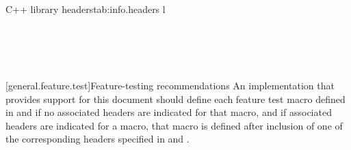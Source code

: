 \begin{floattable}{C++ library headers}{tab:info.headers}
{l}
\topline
{} \\
 \\
 \\ 
 \\
 \\

\end{floattable}

[general.feature.test]{Feature-testing recommendations }
\pnum
An implementation that provides support for this document should define each feature test macro defined in  and  if no associated headers are indicated for that macro, and if associated headers are indicated for a macro, that macro is defined after inclusion of one of the corresponding headers specified in  and .



